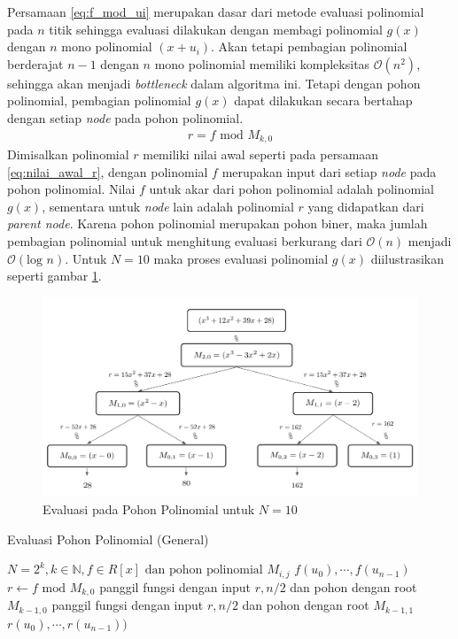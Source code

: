 Persamaan \eqref{eq:f_mod_ui} merupakan dasar dari metode evaluasi polinomial pada $ n $ titik sehingga evaluasi dilakukan dengan membagi polinomial $ g(x) $ dengan $ n $ mono polinomial $ (x + u_i) $. Akan tetapi pembagian polinomial berderajat $ n-1 $ dengan $ n $ mono polinomial memiliki kompleksitas $ \mathcal{O}{(n^2)} $, sehingga akan menjadi \textit{bottleneck} dalam algoritma ini. Tetapi dengan pohon polinomial, pembagian polinomial $g(x)$ dapat dilakukan secara bertahap dengan setiap \textit{node} pada pohon polinomial. 
\begin{equation}
	\begin{aligned}
		r = f \text{ mod }  M_{k,0}
		\label{eq:nilai_awal_r}
	\end{aligned}
\end{equation}
Dimisalkan polinomial $ r $ memiliki nilai awal seperti pada persamaan \eqref{eq:nilai_awal_r}, dengan polinomial $ f $ merupakan input dari setiap \textit{node} pada pohon polinomial. Nilai $ f $ untuk akar dari pohon polinomial adalah polinomial $ g(x) $, sementara untuk \textit{node} lain adalah polinomial $ r $ yang didapatkan dari \textit{parent node}. Karena pohon polinomial merupakan pohon biner, maka jumlah pembagian polinomial untuk menghitung evaluasi berkurang dari $ \mathcal{O}{(n)} $ menjadi $ \mathcal{O}{(\text{log }n)} $. Untuk $ N = 10 $ maka proses evaluasi polinomial $ g(x) $ diilustrasikan seperti gambar \ref{fig:evaluasi-pohon-n-10}.

\begin{figure}
	\Centering
	\includegraphics [scale=0.25]{bab2/img/evaluasi-pohon-n-10}
	\caption{Evaluasi pada Pohon Polinomial untuk $ N = 10 $}
	\label{fig:evaluasi-pohon-n-10}
\end{figure}

\begin{algorithm}
	\caption{Evaluasi Pohon Polinomial (General)}
	\label{psdo:general_evaluasi_pohon_polinomial}
	\begin{algorithmic}[1]
		\Require $ N = 2^k, k \in \mathbb{N},f \in R[x] \text{ dan pohon polinomial } M_{i,j}  $
		\Ensure $ f(u_0), \cdots , f(u_{n-1}) $
		\State $ r \gets f \text{ mod } M_{k,0} $
		\State panggil fungsi dengan input $ r, n/2 $ dan pohon dengan root $ M_{k-1,0} $
		\State panggil fungsi dengan input $ r, n/2 $ dan pohon dengan root $ M_{k-1,1} $ \\
		\Return $ r(u_0), \cdots , r(u_{n-1})) $
	\end{algorithmic}
\end{algorithm}

